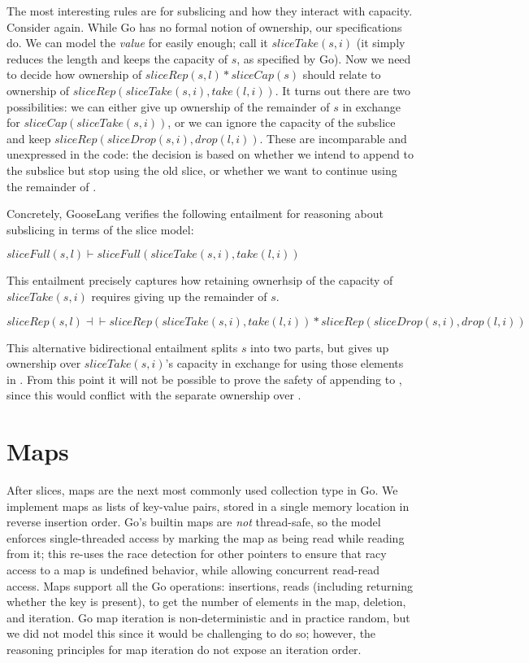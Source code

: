 The most interesting rules are for subslicing and how they interact with
capacity. Consider  again. While Go has no formal
notion of ownership, our specifications do. We can model the
\emph{value} for  easily enough; call it
\(sliceTake(s, i)\) (it simply reduces the length and keeps the capacity
of \(s\), as specified by Go). Now we need to decide how ownership of
\(sliceRep(s, l) * sliceCap(s)\) should relate to ownership of
\(sliceRep(sliceTake(s, i), take(l, i))\). It turns out there are two
possibilities: we can either give up ownership of the remainder of \(s\)
in exchange for \(sliceCap(sliceTake(s, i))\), or we can ignore the
capacity of the subslice and keep
\(sliceRep(sliceDrop(s, i), drop(l, i))\). These are incomparable and
unexpressed in the code: the decision is based on whether we intend to
append to the subslice but stop using the old slice, or whether we want
to continue using the remainder of .

Concretely, GooseLang verifies the following entailment for reasoning
about subslicing in terms of the slice model:

\(sliceFull(s, l) \vdash sliceFull(sliceTake(s, i), take(l, i))\)

This entailment precisely captures how retaining ownerhsip of the
capacity of \(sliceTake(s, i)\) requires giving up the remainder of
\(s\).

\(sliceRep(s, l) \dashv\vdash sliceRep(sliceTake(s, i), take(l, i)) * sliceRep(sliceDrop(s, i), drop(l, i))\)

This alternative bidirectional entailment splits \(s\) into two parts,
but gives up ownership over \(sliceTake(s, i)\)'s capacity in exchange
for using those elements in . From this point it will
not be possible to prove the safety of appending to ,
since this would conflict with the separate ownership over
.

\section{Maps}

After slices, maps are the next most commonly used collection type in
Go. We implement maps as lists of key-value pairs, stored in a single
memory location in reverse insertion order. Go's builtin maps are
\emph{not} thread-safe, so the model enforces single-threaded access by
marking the map as being read while reading from it; this re-uses the
race detection for other pointers to ensure that racy access to a map is
undefined behavior, while allowing concurrent read-read access. Maps
support all the Go operations: insertions, reads (including returning
whether the key is present),  to get the number of elements
in the map, deletion, and iteration. Go map iteration is
non-deterministic and in practice random, but we did not model this
since it would be challenging to do so; however, the reasoning
principles for map iteration do not expose an iteration order.

